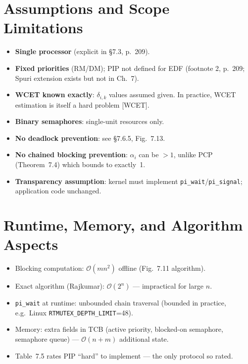 \documentclass[conference,onecolumn]{IEEEtran}
\begin{document}
\section{Assumptions and Scope Limitations}

\begin{itemize}
  \item \textbf{Single processor} (explicit in \S7.3, p.~209).
  \item \textbf{Fixed priorities} (RM/DM); PIP not defined for EDF
        (footnote 2, p.~209; Spuri extension exists but not in Ch.~7).
  \item \textbf{WCET known exactly}: $\delta_{i,k}$ values assumed given.
        In practice, WCET estimation is itself a hard problem [WCET].
  \item \textbf{Binary semaphores}: single-unit resources only.
  \item \textbf{No deadlock prevention}: see \S7.6.5, Fig.~7.13.
  \item \textbf{No chained blocking prevention}: $\alpha_i$ can be $> 1$,
        unlike PCP (Theorem~7.4) which bounds to exactly~1.
  \item \textbf{Transparency assumption}: kernel must implement
        \texttt{pi\_wait}/\texttt{pi\_signal}; application code unchanged.
\end{itemize}

\section{Runtime, Memory, and Algorithm Aspects}

\begin{itemize}
  \item Blocking computation: $\mathcal{O}(mn^2)$ offline
        (Fig.~7.11 algorithm).
  \item Exact algorithm (Rajkumar): $\mathcal{O}(2^n)$ --- impractical
        for large $n$.
  \item \texttt{pi\_wait} at runtime: unbounded chain traversal (bounded
        in practice, e.g.\ Linux \texttt{RTMUTEX\_DEPTH\_LIMIT}=48).
  \item Memory: extra fields in TCB (active priority, blocked-on semaphore,
        semaphore queue) --- $\mathcal{O}(n + m)$ additional state.
  \item Table~7.5 rates PIP ``hard'' to implement --- the only protocol
        so rated.
\end{itemize}
\end{document}
